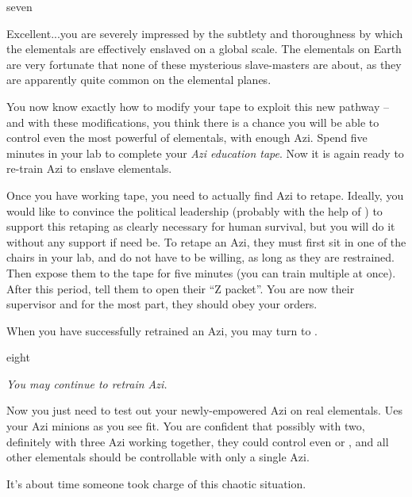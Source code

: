 \documentclass[notebook]{elementals}
\begin{document}
\begin{page}{seven}

Excellent...you are severely impressed by the subtlety and thoroughness by which the elementals are effectively enslaved on a global scale. The elementals on Earth are very fortunate that none of these mysterious slave-masters are about, as they are apparently quite common on the elemental planes.

You now know exactly how to modify your tape to exploit this new pathway -- and with these modifications, you think there is a chance you will be able to control even the most powerful of elementals, with enough Azi. Spend five minutes in your lab to complete your \emph{Azi education tape}. Now it is again ready to re-train Azi to enslave elementals.

Once you have working tape, you need to actually find Azi to retape. Ideally, you would like to convince the political leadership (probably with the help of \cDema{}) to support this retaping as clearly necessary for human survival, but you will do it without any support if need be. To retape an Azi, they must first sit in one of the chairs in your lab, and do not have to be willing, as long as they are restrained. Then expose them to the tape for five minutes (you can train multiple at once). After this period, tell them to open their ``Z packet''. You are now their supervisor and for the most part, they should obey your orders.

When you have successfully retrained an Azi, you may turn to .

\end{page}

\begin{page}{eight}

\emph{You may continue to retrain Azi.}

Now you just need to test out your newly-empowered Azi on real elementals. Ues your Azi minions as you see fit. You are confident that possibly with two, definitely with three Azi working together, they could control even \cQueen{} or \cKing{}, and all other elementals should be controllable with only a single Azi.

It's about time someone took charge of this chaotic situation.

\end{page}

\endnotebook
\end{document}
